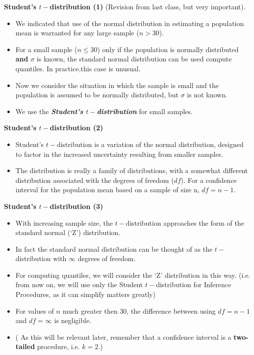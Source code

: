 \noindent \textbf{Student's $t-$distribution (1)}
(Revision from last class, but very important).
\begin{itemize} \item We indicated that use of the normal distribution in estimating a population mean is warranted for any large sample ($n > 30$).

\item For a small sample ($n \leq 30$) only if the population is normally distributed \textbf{and} $\sigma$ is known, the standard normal distribution can be used compute quantiles. In practice,this case is unusual.

\item Now we consider the situation in which the sample is small and the population is assumed to be normally distributed, but $\sigma$ is not known.
\item We use the \textbf{\textit{Student's $t-$distribution}} for small samples.
\end{itemize}


\noindent \textbf{Student's $t-$distribution (2)}
\begin{itemize}
\item Student's $t-$distribution is a variation of the normal distribution, designed to factor in the increased uncertainty resulting from smaller samples.
\item The distribution is really a family of distributions, with
a somewhat different distribution associated with the degrees of freedom ($df$). For a confidence interval for the
population mean based on a sample of size n, $df = n - 1$.
\end{itemize}



\noindent \textbf{Student's $t-$distribution (3)}
\begin{itemize}
\item With increasing
sample size, the $t-$distribution approaches the form of the standard normal (`Z') distribution.
\item In fact the standard normal distribution can be thought of as the $t-$distribution with $\infty$ degrees of freedom.
\item For computing quantiles, we will consider the `Z' distribution in this way.
(i.e. from now on, we will use only the Student $t-$distribution for Inference Procedures, as it can simplify matters greatly)

\item For values of $n$ much greater then 30, the difference between using $df = n-1$ and $df = \infty$ is negligible.

\item ( As this will be relevant later, remember that a confidence interval is a \textbf{two-tailed} procedure, i.e. $k=2$.)
\end{itemize}



